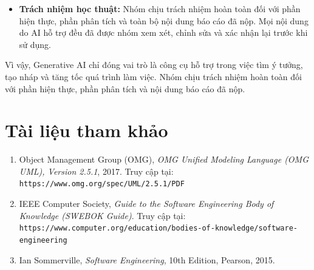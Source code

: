 \begin{itemize}
	\item \textbf{Trách nhiệm học thuật:} Nhóm chịu trách nhiệm hoàn toàn đối với phần hiện thực, phần phân tích và toàn bộ nội dung báo cáo đã nộp. Mọi nội dung do AI hỗ trợ đều đã được nhóm xem xét, chỉnh sửa và xác nhận lại trước khi sử dụng.
\end{itemize}

Vì vậy, Generative AI chỉ đóng vai trò là công cụ hỗ trợ trong việc tìm ý tưởng, tạo nháp và tăng tốc quá trình làm việc. Nhóm chịu trách nhiệm hoàn toàn đối với phần hiện thực, phần phân tích và nội dung báo cáo đã nộp.

\newpage

\section{Tài liệu tham khảo}

\begin{enumerate}
	\item Object Management Group (OMG), \textit{OMG Unified Modeling Language (OMG UML), Version 2.5.1}, 2017. Truy cập tại: \texttt{https://www.omg.org/spec/UML/2.5.1/PDF}

	\item IEEE Computer Society, \textit{Guide to the Software Engineering Body of Knowledge (SWEBOK Guide)}. Truy cập tại: \texttt{https://www.computer.org/education/bodies-of-knowledge/software-engineering}
	
	\item Ian Sommerville, \textit{Software Engineering}, 10th Edition, Pearson, 2015.
\end{enumerate}

